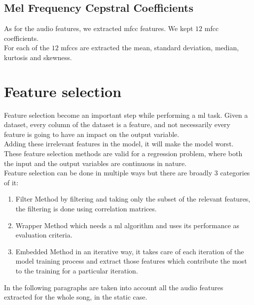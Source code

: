 \subsection{Mel Frequency Cepstral Coefficients}
As for the audio features, we extracted \gls{mfcc} features. We kept $12$ \gls{mfcc} coefficients.
\\
For each of the $12$ \gls{mfcc}s are extracted the mean, standard deviation, median, kurtosis and skewness.

\section{Feature selection}\label{feature_selection_5}
Feature selection become an important step while performing a \gls{ml} task. Given a dataset, every column of the dataset is a feature, and not necessarily every feature is going to have an impact on the output variable.
\\
Adding these irrelevant features in the model, it will make the model worst.
\\
These feature selection methods are valid for a regression problem, where both the input and the output variables are continuous in nature.
\\ \indent
Feature selection can be done in multiple ways but there are broadly 3 categories of it:
\begin{enumerate}
	\item Filter Method by filtering and taking only the subset of the relevant features, the filtering is done using correlation matrices. 
	\item Wrapper Method which needs a \gls{ml} algorithm and uses its performance as evaluation criteria.
	\item Embedded Method in an iterative way, it takes care of each iteration of the model training process and extract those features which contribute the most to the training for a particular iteration.
\end{enumerate}
In the following paragraphs are taken into account all the audio features extracted for the whole song, in the static case.

